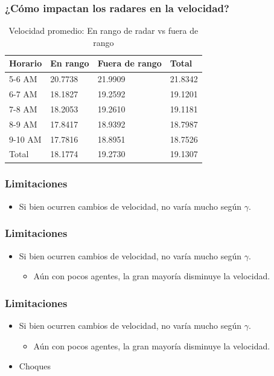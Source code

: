\documentclass[10pt, compress]{beamer}
\begin{document}
\begin{frame}[fragile]
\frametitle{¿C\'omo impactan los radares en la velocidad?}
  \begin{table}
    \caption{Velocidad promedio: En rango de radar vs fuera de rango}
    \begin{tabular}{llll}
      \toprule
      Horario & En rango & Fuera de rango & Total \\
      \midrule
      5-6 AM & 20.7738 & 21.9909 & 21.8342\\
      6-7 AM & 18.1827 & 19.2592 & 19.1201\\
      7-8 AM & 18.2053 & 19.2610 & 19.1181\\
      8-9 AM & 17.8417 & 18.9392 & 18.7987\\
      9-10 AM & 17.7816 & 18.8951 & 18.7526\\
      Total & 18.1774 & 19.2730 & 19.1307\\
      \bottomrule
    \end{tabular}
  \end{table}
\end{frame}

\begin{frame}[fragile]
\frametitle{Limitaciones}

\begin{itemize}
\item Si bien ocurren cambios de velocidad, no var\'ia mucho seg\'un $\gamma$. 
\end{itemize}

\end{frame}

\begin{frame}[fragile]
\frametitle{Limitaciones}

\begin{itemize}
\item Si bien ocurren cambios de velocidad, no var\'ia mucho seg\'un $\gamma$. 
	\begin{itemize}
	\item A\'un con pocos agentes, la gran mayor\'ia disminuye la velocidad.
	\end{itemize}
\end{itemize}

\end{frame}

\begin{frame}[fragile]
\frametitle{Limitaciones}

\begin{itemize}
\item Si bien ocurren cambios de velocidad, no var\'ia mucho seg\'un $\gamma$. 
	\begin{itemize}
	\item A\'un con pocos agentes, la gran mayor\'ia disminuye la velocidad.
	\end{itemize}
\item Choques
\end{itemize}

\end{frame}
\end{document}
